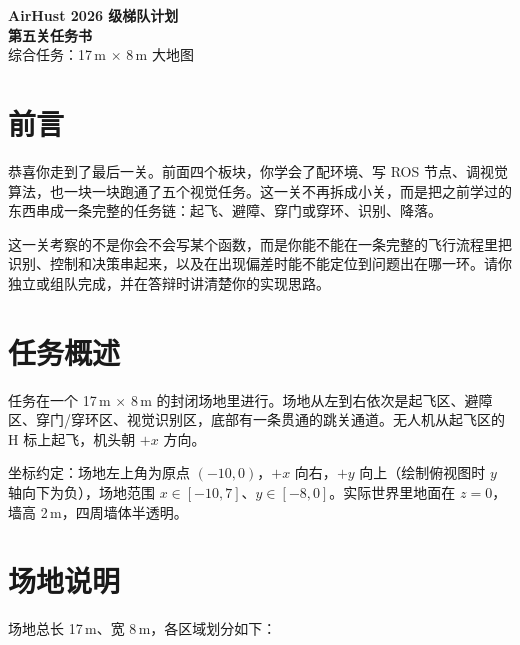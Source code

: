 \documentclass[11pt]{ctexart}
\begin{document}
\begin{center}
{\LARGE\bfseries AirHust 2026 级梯队计划}\\[0.3em]
{\LARGE\bfseries 第五关任务书}\\[0.6em]
{\large 综合任务：17\,m $\times$ 8\,m 大地图}
\end{center}

\vspace{0.6em}

\section{前言}

恭喜你走到了最后一关。前面四个板块，你学会了配环境、写 ROS 节点、调视觉算法，也一块一块跑通了五个视觉任务。这一关不再拆成小关，而是把之前学过的东西串成一条完整的任务链：起飞、避障、穿门或穿环、识别、降落。

这一关考察的不是你会不会写某个函数，而是你能不能在一条完整的飞行流程里把识别、控制和决策串起来，以及在出现偏差时能不能定位到问题出在哪一环。请你独立或组队完成，并在答辩时讲清楚你的实现思路。

\section{任务概述}

任务在一个 17\,m $\times$ 8\,m 的封闭场地里进行。场地从左到右依次是起飞区、避障区、穿门/穿环区、视觉识别区，底部有一条贯通的跳关通道。无人机从起飞区的 H 标上起飞，机头朝 $+x$ 方向。

坐标约定：场地左上角为原点 $(-10,0)$，$+x$ 向右，$+y$ 向上（绘制俯视图时 $y$ 轴向下为负），场地范围 $x\in[-10,7]$、$y\in[-8,0]$。实际世界里地面在 $z=0$，墙高 2\,m，四周墙体半透明。

\section{场地说明}

场地总长 17\,m、宽 8\,m，各区域划分如下：
\end{document}
